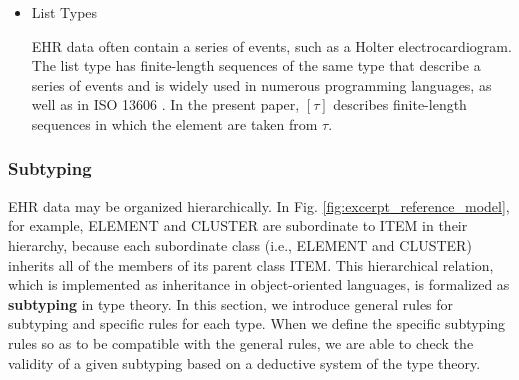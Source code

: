 \documentclass[preprint,3p,onecolumn,times,review]{elsarticle}
\begin{document}
\begin{itemize}
  While the record type requires all of the fields to be set by values, there is a case in which only one of the fields must be filled in.
  Figure \ref{fig:example_variant_type} is an example of such a case, and this fragment of the archetype should be encoded as a variant type.
  The variant type, which is a named disjoint union of types, is a type into which values fall into a limited number of categories \cite{pierce02:_types_progr_languag,cardelli04:_type_system}.

  \begin{figure}[!htbp]
    \begin{verbatim}
            DV_CODED_TEXT matches {
              defining_code matches {
                [local::
                 at1000, -- Hepatitis A
                 at1001 -- Hepatitis B
                ]
              }
            }
    \end{verbatim}
    \caption{Example of a Variant Type in DV\_CODED\_TEXT}\label{fig:example_variant_type}
    This fragment is an example of a variant type and defines a constraint of type DV\_CODED\_TEXT, the value of which should be either hepatitis A or B.
  \end{figure}

\item List Types

  EHR data often contain a series of events, such as a Holter electrocardiogram.
  The list type has finite-length sequences of the same type that describe a series of events and is widely used in numerous programming languages, as well as in ISO 13606 \cite{cardelli04:_type_system,pierce02:_types_progr_languag,geuvers09:_introd_type_theor}.
  In the present paper, $[\tau]$ describes finite-length sequences in which the element are taken from $\tau$.
\end{itemize}


\subsubsection{Subtyping}

EHR data may be organized hierarchically.
In Fig. \ref{fig:excerpt_reference_model}, for example, {\sf ELEMENT} and {\sf CLUSTER} are subordinate to {\sf ITEM} in their hierarchy, because each subordinate class (i.e., {\sf ELEMENT} and {\sf CLUSTER}) inherits all of the members of its parent class {\sf ITEM}.
This hierarchical relation, which is implemented as inheritance in object-oriented languages, is formalized as {\bf subtyping} in type theory\cite[p.85]{craig07:_objec_orien_progr_languag}.
In this section, we introduce general rules for subtyping and specific rules for each type.
When we define the specific subtyping rules so as to be compatible with the general rules, we are able to check the validity of a given subtyping based on a deductive system of the type theory.
\end{document}
